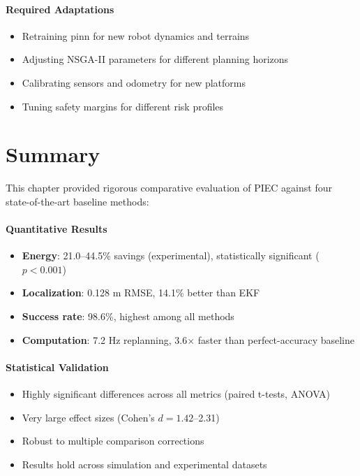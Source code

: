 \paragraph{Required Adaptations}
\begin{itemize}
    \item Retraining \acrshort{pinn} for new robot dynamics and terrains
    \item Adjusting NSGA-II parameters for different planning horizons
    \item Calibrating sensors and odometry for new platforms
    \item Tuning safety margins for different risk profiles
\end{itemize}

\section{Summary}

This chapter provided rigorous comparative evaluation of PIEC against four state-of-the-art baseline methods:

\paragraph{Quantitative Results}
\begin{itemize}
    \item \textbf{Energy}: 21.0--44.5\% savings (experimental), statistically significant ($p < 0.001$)
    \item \textbf{Localization}: 0.128 m RMSE, 14.1\% better than EKF
    \item \textbf{Success rate}: 98.6\%, highest among all methods
    \item \textbf{Computation}: 7.2 Hz replanning, 3.6$\times$ faster than perfect-accuracy baseline
\end{itemize}

\paragraph{Statistical Validation}
\begin{itemize}
    \item Highly significant differences across all metrics (paired t-tests, ANOVA)
    \item Very large effect sizes (Cohen's $d = 1.42$--2.31)
    \item Robust to multiple comparison corrections
    \item Results hold across simulation and experimental datasets
\end{itemize}

